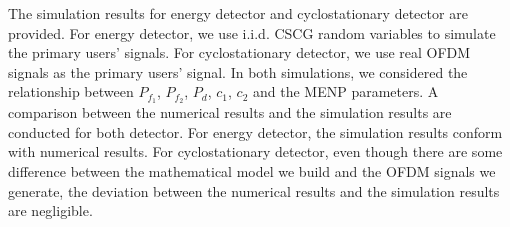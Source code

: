 The simulation results for energy detector and cyclostationary detector are provided. 
For energy detector, we use i.i.d. CSCG random variables to simulate the primary users' signals. For cyclostationary detector, we use real OFDM signals as the primary users' signal.  
In both simulations, we considered the relationship between $P_{f_1}$, $P_{f_2}$, $P_d$, $c_1$, $c_2$ and the MENP parameters.  A comparison between the numerical results and the simulation results are conducted for both detector.
For energy detector, the simulation results conform with numerical results. For cyclostationary detector, even though there are some difference between the mathematical model we build and the OFDM signals we generate, the deviation between the numerical results and the simulation results are negligible.  
